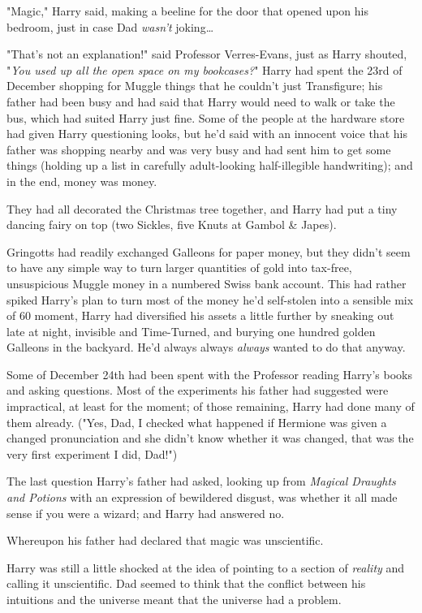 "Magic," Harry said, making a beeline for the door that opened upon his 
bedroom, just in case Dad \emph{wasn't} joking{\ldots}

"That's not an explanation!" said Professor Verres-Evans, just as Harry 
shouted, "\emph{You used up all the open space on my bookcases?}"
\sbreak
Harry had spent the 23rd of December shopping for Muggle things that he 
couldn't just Transfigure; his father had been busy and had said that Harry 
would need to walk or take the bus, which had suited Harry just fine. Some of 
the people at the hardware store had given Harry questioning looks, but he'd 
said with an innocent voice that his father was shopping nearby and was very 
busy and had sent him to get some things (holding up a list in carefully 
adult-looking half-illegible handwriting); and in the end, money was money.

They had all decorated the Christmas tree together, and Harry had put a tiny 
dancing fairy on top (two Sickles, five Knuts at Gambol \& Japes).

Gringotts had readily exchanged Galleons for paper money, but they didn't seem 
to have any simple way to turn larger quantities of gold into tax-free, 
unsuspicious Muggle money in a numbered Swiss bank account. This had rather 
spiked Harry's plan to turn most of the money he'd self-stolen into a sensible 
mix of 60%
moment, Harry had diversified his assets a little further by sneaking out late 
at night, invisible and Time-Turned, and burying one hundred golden Galleons in 
the backyard. He'd always always \emph{always} wanted to do that anyway.

Some of December 24th had been spent with the Professor reading Harry's books 
and asking questions. Most of the experiments his father had suggested were 
impractical, at least for the moment; of those remaining, Harry had done many 
of them already. ("Yes, Dad, I checked what happened if Hermione was given a 
changed pronunciation and she didn't know whether it was changed, that was the 
very first experiment I did, Dad!")

The last question Harry's father had asked, looking up from \emph{Magical 
Draughts and Potions} with an expression of bewildered disgust, was whether it 
all made sense if you were a wizard; and Harry had answered no.

Whereupon his father had declared that magic was unscientific.

Harry was still a little shocked at the idea of pointing to a section of 
\emph{reality} and calling it unscientific. Dad seemed to think that the 
conflict between his intuitions and the universe meant that the universe had a 
problem.

